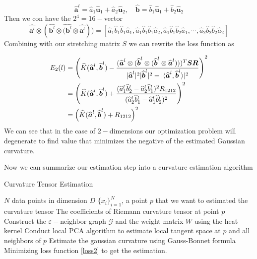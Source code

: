 \documentclass{article}
\begin{document}
\begin{equation}
	\widehat{\boldsymbol{a}}^l=\widehat{a}_1\widehat{\boldsymbol{u}}_1+\widehat{a}_2\widehat{\boldsymbol{u}}_2,\quad \widehat{\boldsymbol{b}}=\widehat{b}_1\widehat{\boldsymbol{u}}_1+\widehat{b}_2\widehat{\boldsymbol{u}}_2
\end{equation}
Then we con have the $2^4=16-$vector
\begin{equation}
	\widehat{\boldsymbol{a}^l}\otimes(\widehat{\boldsymbol{b}^l}\otimes\widehat{(\boldsymbol{b}^l}\otimes\widehat{\boldsymbol{a}^l}))=[\widehat{a}_1\widehat{b}_1\widehat{b}_1\widehat{a}_1,\widehat{a}_1\widehat{b}_1\widehat{b}_1\widehat{a}_2,\widehat{a}_1\widehat{b}_1\widehat{b}_2\widehat{a}_1,\cdots,\widehat{a}_2\widehat{b}_2\widehat{b}_2\widehat{a}_2]
\end{equation}
Combining with our stretching matrix $S$ we can rewrite the loss function as

\begin{align}
	\notag
	E_2(l)&=\left(\widehat{K}(\widehat{\boldsymbol{a}}^l,\widehat{\boldsymbol{b}}^l)-\frac{(\widehat{\boldsymbol{a}}^l\otimes(\widehat{\boldsymbol{b}}^l\otimes(\widehat{\boldsymbol{b}}^l\otimes\widehat{\boldsymbol{a}}^l)))^T\boldsymbol{S}\boldsymbol{R}}{|\widehat{\boldsymbol{a}}^l|^2|\widehat{\boldsymbol{b}}^l|^2-|\langle \widehat{\boldsymbol{a}}^l,\widehat{\boldsymbol{b}}^l\rangle|^2}\right)^2 \\
	\notag
	&=\left(\widehat{K}(\widehat{\boldsymbol{a}}^l,\widehat{\boldsymbol{b}}^l)+\frac{(\widehat{a}_1^l\widehat{b}_2^l-\widehat{a}_2^l\widehat{b}_1^l)^2R_{1212}}{(\widehat{a}_2^l\widehat{b}_1^l-\widehat{a}_1^l\widehat{b}_2^l)^2}\right)^2 \\
	&=\left(\widehat{K}(\widehat{\boldsymbol{a}}^l,\widehat{\boldsymbol{b}}^l)+R_{1212}\right)^2 
\end{align}
We can see that in the case of $2-$dimensions our optimization problem will degenerate to find value that minimizes the negative of the estimated Gaussian curvature.
\par
Now we can summarize our estimation step into a curvature estimation algorithm
\begin{algorithm}
	\renewcommand{\algorithmicrequire}{\textbf{Input:}}
	\renewcommand{\algorithmicensure}{\textbf{Output:}}
	\caption{Curvature Tensor Estimation}
	\begin{algorithmic}[1]
	\REQUIRE $N$ data points in dimension $D$ $\{x_i\}_{i=1}^N$, a point $p$ that we want to estimated the curvature tensor
	\ENSURE The coefficients of Riemann curvature tensor at point $p$
	\STATE Construct the $\varepsilon-$neighbor graph $\mathcal{G}$ and the weight matrix $W$ using the heat kernel
	\STATE Conduct local PCA algorithm to estimate local tangent space at $p$ and all neighbors of $p$
		 	\STATE Estimate the gaussian curvature using Gauss-Bonnet formula
		 \ENDIF
	\ENDFOR
	\STATE Minimizing loss function \ref{loss2} to get the estimation.
	\end{algorithmic}
\end{algorithm}
\end{document}
